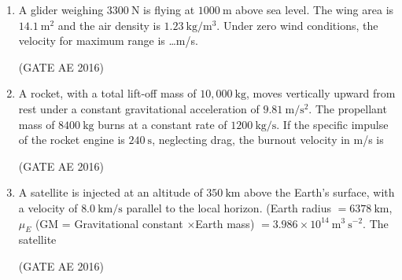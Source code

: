 \documentclass[journal,12pt,onecolumn]{IEEEtran}
\theoremstyle{remark}
\begin{document}
\begin{enumerate}
\item A glider weighing $3300~\mathrm{N}$ is flying at $1000~\mathrm{m}$ above sea level. The wing area is $14.1~\mathrm{m^2}$ and the air density is $1.23~\mathrm{kg/m^3}$. Under zero wind conditions, the velocity for maximum range is \dots m/s.


\hfill(GATE AE 2016)



\item A rocket, with a total lift-off mass of $10,000~\mathrm{kg}$, moves vertically upward from rest under a constant gravitational acceleration of $9.81~\mathrm{m/s^2}$. The propellant mass of $8400~\mathrm{kg}$ burns at a constant rate of $1200~\mathrm{kg/s}$. If the specific impulse of the rocket engine is $240~\mathrm{s}$, neglecting drag, the burnout velocity in m/s is
\begin{enumerate}
\end{enumerate}
\hfill(GATE AE 2016)



\item A satellite is injected at an altitude of $350~\mathrm{km}$ above the Earth's surface, with a velocity of $8.0~\mathrm{km/s}$ parallel to the local horizon. (Earth radius $= 6378~\mathrm{km}$, $\mu_E$ (GM = Gravitational constant $\times$Earth mass) $= 3.986 \times 10^{14}~\mathrm{m^3~s^{-2}}$. The satellite
\begin{enumerate}
\end{enumerate}
\hfill(GATE AE 2016)


 \newpage

 
 
\end{enumerate}
\end{document}
